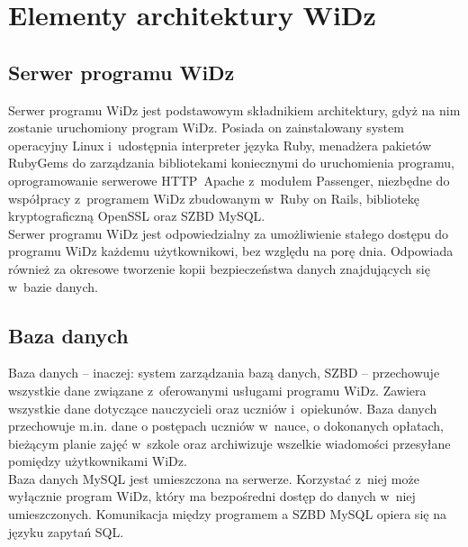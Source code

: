 \documentclass[12pt,leqno,twoside]{mwart}
\begin{document}
\section{Elementy architektury WiDz}
\subsection{Serwer programu WiDz}
\noindent Serwer programu WiDz jest podstawowym składnikiem architektury, gdyż na nim zostanie uruchomiony program WiDz. Posiada on zainstalowany system operacyjny Linux i~udostępnia interpreter języka Ruby, menadżera pakietów RubyGems do zarządzania bibliotekami koniecznymi do uruchomienia programu, oprogramowanie serwerowe \hbox{HTTP Apache} z~modułem Passenger, niezbędne do współpracy z~programem WiDz zbudowanym w~Ruby on Rails, bibliotekę kryptograficzną OpenSSL oraz SZBD MySQL.\\
\indent Serwer programu WiDz jest odpowiedzialny za umożliwienie stałego dostępu do programu WiDz każdemu użytkownikowi, bez względu na porę dnia. Odpowiada również za okresowe tworzenie kopii bezpieczeństwa danych znajdujących się w~bazie danych. 

\subsection{Baza danych}
\noindent Baza danych -- inaczej: system zarządzania bazą danych, SZBD -- przechowuje wszystkie dane związane z~oferowanymi usługami programu WiDz. Zawiera wszystkie dane dotyczące nauczycieli oraz uczniów i~opiekunów. Baza danych przechowuje m.in. dane o postępach uczniów w~nauce, o dokonanych opłatach, bieżącym planie zajęć w~szkole oraz archiwizuje wszelkie wiadomości przesyłane pomiędzy użytkownikami WiDz.\\
\indent Baza danych  MySQL jest umieszczona na serwerze. Korzystać z~niej może wyłącznie program WiDz, który ma bezpośredni dostęp do danych w~niej umieszczonych. Komunikacja między programem a SZBD MySQL opiera się na języku zapytań SQL.
\end{document}
